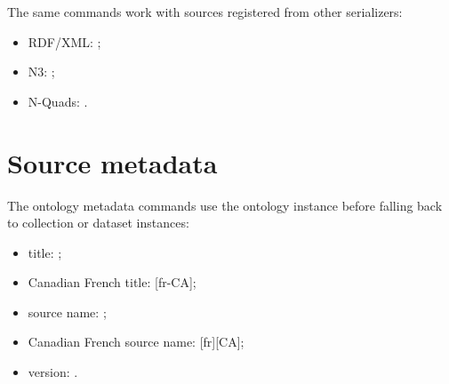 \documentclass[11pt,letterpaper]{article}
\begin{document}
The same commands work with sources registered from other serializers:

\begin{itemize}
  \item RDF/XML: ;
  \item N3: ;
  \item N-Quads: .
\end{itemize}

\section{Source metadata}

The ontology metadata commands use the ontology instance before falling back
to collection or dataset instances:

\begin{itemize}
  \item title: ;
  \item Canadian French title: [fr-CA];
  \item source name: ;
  \item Canadian French source name: [fr][CA];
  \item version: .
\end{itemize}
\end{document}
